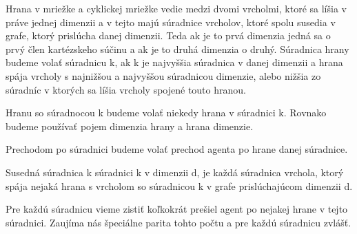 \begin{ozn}
Hrana v mriežke a cyklickej mriežke vedie medzi dvomi vrcholmi, 
ktoré sa líšia v práve jednej dimenzii a v tejto majú súradnice vrcholov,
ktoré spolu susedia v grafe, ktorý prislúcha danej dimenzii. Teda ak je to
prvá dimenzia jedná sa o prvý člen kartézskeho súčinu a ak je to druhá
dimenzia o druhý. Súradnica hrany budeme volať súradnicu k, ak k je
najvyššia súradnica v danej dimenzii a hrana spája vrcholy s najnižšou a
najvyššou súradnicou dimenzie, alebo nižšia zo súradníc v ktorých sa líšia
vrcholy spojené touto hranou.

Hranu so súradnocou k budeme volať niekedy hrana v súradnici k. Rovnako
budeme používať pojem dimenzia hrany a hrana dimenzie.
\end{ozn}
\begin{ozn}
Prechodom po súradnici budeme volať prechod agenta po hrane danej súradnice.
\end{ozn}

\begin{ozn}
Susedná súradnica k súradnici k v dimenzii d, je každá súradnica vrchola,
ktorý
spája nejaká hrana s vrcholom so súradnicou k 
v grafe prislúchajúcom dimenzii d.
\end{ozn}

Pre každú súradnicu vieme zistiť koľkokrát prešiel agent po nejakej hrane v
tejto súradnici. Zaujíma nás špeciálne parita tohto počtu a pre každú
súradnicu zvlášť.


